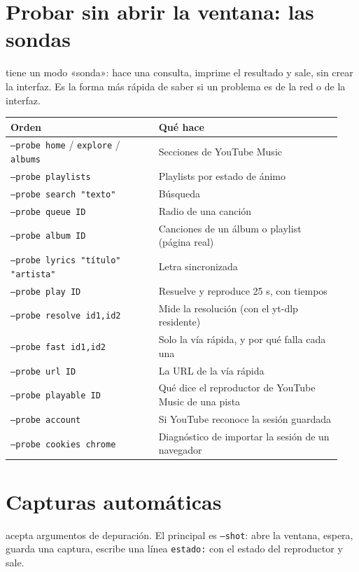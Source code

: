 \section{Probar sin abrir la ventana: las sondas}

 tiene un modo «sonda»: hace una consulta, imprime el resultado y sale,
sin crear la interfaz. Es la forma más rápida de saber si un problema es de la red o de la
interfaz.

\begin{center}
\small
\begin{longtable}{@{}p{0.42\linewidth}p{0.52\linewidth}@{}}
\toprule
Orden & Qué hace \\
\midrule
\endhead
\texttt{--probe home} / \texttt{explore} / \texttt{albums} & Secciones de YouTube Music \\
\texttt{--probe playlists} & Playlists por estado de ánimo \\
\texttt{--probe search "texto"} & Búsqueda \\
\texttt{--probe queue ID} & Radio de una canción \\
\texttt{--probe album ID} & Canciones de un álbum o playlist (página real) \\
\texttt{--probe lyrics "título" "artista"} & Letra sincronizada \\
\texttt{--probe play ID} & Resuelve y reproduce 25 s, con tiempos \\
\texttt{--probe resolve id1,id2} & Mide la resolución (con el yt-dlp residente) \\
\texttt{--probe fast id1,id2} & Solo la vía rápida, y por qué falla cada una \\
\texttt{--probe url ID} & La URL de la vía rápida \\
\texttt{--probe playable ID} & Qué dice el reproductor de YouTube Music de una pista \\
\texttt{--probe account} & Si YouTube reconoce la sesión guardada \\
\texttt{--probe cookies chrome} & Diagnóstico de importar la sesión de un navegador \\
\bottomrule
\end{longtable}
\end{center}

\section{Capturas automáticas}

 acepta argumentos de depuración. El principal es \texttt{--shot}: abre
la ventana, espera, guarda una captura, escribe una línea \texttt{estado:} con el estado del
reproductor y sale.

